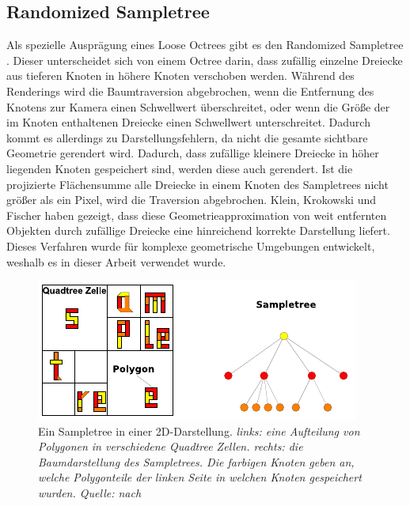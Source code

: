 \subsection{Randomized Sampletree}
\label{sec:basics:sampletree}
Als spezielle Ausprägung eines Loose Octrees gibt es den Randomized Sampletree \cite{klein}. Dieser unterscheidet sich von einem Octree darin, dass zufällig einzelne Dreiecke aus tieferen Knoten in höhere Knoten verschoben werden. Während des Renderings wird die Baumtraversion abgebrochen, wenn die Entfernung des Knotens zur Kamera einen Schwellwert überschreitet, oder wenn die Größe der im Knoten enthaltenen Dreiecke einen Schwellwert unterschreitet. Dadurch kommt es allerdings zu Darstellungsfehlern, da nicht die gesamte sichtbare Geometrie gerendert wird. Dadurch, dass zufällige kleinere Dreiecke in höher liegenden Knoten gespeichert sind, werden diese auch gerendert. Ist die projizierte Flächensumme alle Dreiecke in einem Knoten des Sampletrees nicht größer als ein Pixel, wird die Traversion abgebrochen. Klein, Krokowski und Fischer \cite{klein} haben gezeigt, dass diese Geometrieapproximation von weit entfernten Objekten durch zufällige Dreiecke eine hinreichend korrekte Darstellung liefert. Dieses Verfahren wurde für komplexe geometrische Umgebungen entwickelt, weshalb es in dieser Arbeit verwendet wurde.
\begin{figure}
 \centering
  \includegraphics[scale=1.7]{images/sampletree2.pdf}
  \caption{Ein Sampletree in einer 2D-Darstellung. \textit{links: eine Aufteilung von Polygonen in verschiedene Quadtree Zellen. rechts: die Baumdarstellung des Sampletrees. Die farbigen Knoten geben an, welche Polygonteile der linken Seite in welchen Knoten gespeichert wurden. Quelle: nach \cite{klein}}}
 \label{fig:basics:sampletree}
\end{figure}

